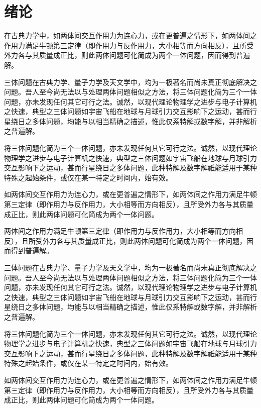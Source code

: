 \documentclass{dmuthesis}
\begin{document}
\mainmatter 
\chapter{绪论}

在古典力学中，如两体间交互作用力为连心力，或在更普遍之情形下，如两体间之作用力满足牛顿第三定律（即作用力与反作用力，大小相等而方向相反），且所受外力各与其质量成正比，则此两体问题可化简成为两个一体问题，因而得到普遍解。

三体问题在古典力学、量子力学及天文学中，均为一极著名而尚未真正彻底解决之问题。吾人至今尚无法以与处理两体问题相似之方法，将三体问题化简为三个一体问题，亦未发现任何其它可行之法。诚然，以现代理论物理学之进步与电子计算机之快速，典型之三体问题如宇宙飞船在地球与月球引力交互影响下之运动，甚而行星绕日之多体问题，均能与以相当精确之描述，惟此仅系特解或数字解，并非解析之普遍解。

将三体问题化简为三个一体问题，亦未发现任何其它可行之法。诚然，以现代理论物理学之进步与电子计算机之快速，典型之三体问题如宇宙飞船在地球与月球引力交互影响下之运动，甚而行星绕日之多体问题，此种特解及数字解祇能适用于某种特殊之起始条件，或仅在某一特定之时间内，始有效。

如两体间交互作用力为连心力，或在更普遍之情形下，如两体间之作用力满足牛顿第三定律（即作用力与反作用力，大小相等而方向相反），且所受外力各与其质量成正比，则此两体问题可化简成为两个一体问题。

两体间之作用力满足牛顿第三定律（即作用力与反作用力，大小相等而方向相反），且所受外力各与其质量成正比，则此两体问题可化简成为两个一体问题，因而得到普遍解。

三体问题在古典力学、量子力学及天文学中，均为一极著名而尚未真正彻底解决之问题。吾人至今尚无法以与处理两体问题相似之方法，将三体问题化简为三个一体问题，亦未发现任何其它可行之法。诚然，以现代理论物理学之进步与电子计算机之快速，典型之三体问题如宇宙飞船在地球与月球引力交互影响下之运动，甚而行星绕日之多体问题，均能与以相当精确之描述，惟此仅系特解或数字解，并非解析之普遍解。

将三体问题化简为三个一体问题，亦未发现任何其它可行之法。诚然，以现代理论物理学之进步与电子计算机之快速，典型之三体问题如宇宙飞船在地球与月球引力交互影响下之运动，甚而行星绕日之多体问题，此种特解及数字解祇能适用于某种特殊之起始条件，或仅在某一特定之时间内，始有效。

如两体间交互作用力为连心力，或在更普遍之情形下，如两体间之作用力满足牛顿第三定律（即作用力与反作用力，大小相等而方向相反），且所受外力各与其质量成正比，则此两体问题可化简成为两个一体问题。
\end{document}
